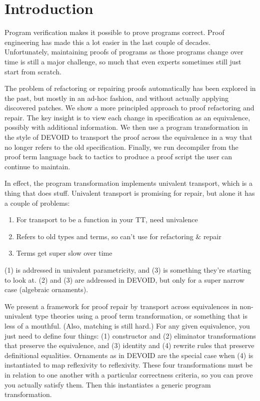 \section{Introduction}

Program verification makes it possible to prove programs correct.
Proof engineering has made this a lot easier in the last couple of decades.
Unfortunately, maintaining proofs of programs as those programs change over
time is still a major challenge,
so much that even experts sometimes still just start from scratch.

The problem of refactoring or repairing proofs automatically has been explored in the past,
but mostly in an ad-hoc fashion, and without actually applying discovered patches.
We show a more principled approach to proof refactoring and repair.
The key insight is to view each change in specification as an equivalence, possibly with additional information.
We then use a program transformation in the style of DEVOID to transport the proof across the equivalence in a way that no longer refers to the
old specification. Finally, we run decompiler from the proof term language back to tactics
to produce a proof script the user can continue to maintain.

In effect, the program transformation implements univalent transport, which is a thing that does stuff.
Univalent transport is promising for repair, but alone it has a couple of problems:

\begin{enumerate}
  \item For transport to be a function in your TT, need univalence
  \item Refers to old types and terms, so can't use for refactoring \& repair
  \item Terms get super slow over time
\end{enumerate}
(1) is addressed in univalent parametricity, and (3) is something they're starting to look at. (2) and (3) are addressed in DEVOID,
but only for a super narrow case (algebraic ornaments).

We present a framework for proof repair by transport across equivalences in non-univalent type theories using a proof term transformation,
or something that is less of a mouthful. (Also, matching is still hard.)
For any given equivalence, you just need to define four things: (1) constructor and (2) eliminator transformations that preserve the equivalence, and (3) identity and (4) rewrite rules that preserve definitional equalities.
Ornaments as in DEVOID are the special case when (4) is instantiated to map reflexivity to reflexivity.
These four transformations must be in relation to one another with a particular correctness criteria, so you can
prove you actually satisfy them. Then this instantiates a generic program transformation.

